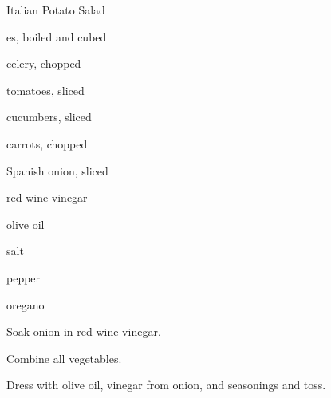 \begin{recipe}{Italian Potato Salad}{}{}

\begin{ingredients}
\item {}es, boiled and cubed
\item celery, chopped
\item tomatoes, sliced
\item cucumbers, sliced
\item carrots, chopped
\item Spanish onion, sliced
\item red wine vinegar
\item olive oil
\item salt
\item pepper
\item oregano
\end{ingredients}

\begin{directions}
\item Soak onion in red wine vinegar.
\item Combine all vegetables.
\item Dress with olive oil, vinegar from onion, and seasonings and toss.
\end{directions}

\end{recipe}
